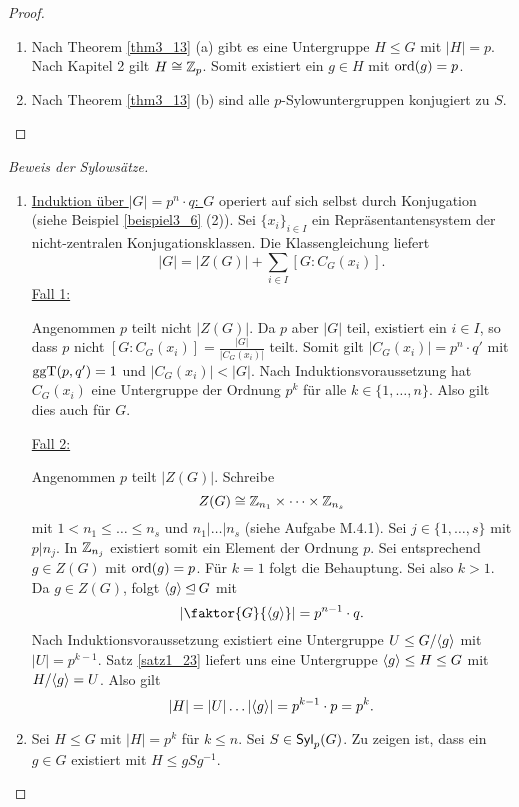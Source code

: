 \begin{proof}
	\begin{enumerate}[label=(\alph*)]
		\item Nach Theorem \ref{thm3_13} (a) gibt es eine Untergruppe $H \leq G$ mit $|H| = p$. Nach Kapitel 2 gilt $H \cong \mathbb{Z}_p$. Somit existiert ein $g \in H$ mit $\mathrm{ord}(g) = p$.
		\item Nach Theorem \ref{thm3_13} (b) sind alle $p$-Sylowuntergruppen konjugiert zu $S$.
	\end{enumerate}
\end{proof}
\begin{proof}[Beweis der Sylowsätze]
	\begin{enumerate}[label=(\alph*)]
		\item \underline{Induktion über $|G| = p^n \cdot q$: } $G$ operiert auf sich selbst durch Konjugation (siehe Beispiel \ref{beispiel3_6} (2)). Sei $\{x_i\}_{i \in I}$ ein Repräsentantensystem der nicht-zentralen Konjugationsklassen. Die Klassengleichung liefert
		\[|G| = |Z(G)| + \sum_{i \in I} [G : C_G(x_i)].\]
		\underline{Fall 1:}
		
		Angenommen $p$ teilt nicht $|Z(G)|$. Da $p$ aber $|G|$ teil, existiert ein $i \in I$, so dass $p$ nicht $[G : C_G(x_i)]=\frac{|G|}{|C_G(x_i)|}$ teilt. Somit gilt $|C_G(x_i)| = p^n \cdot q'$ mit $\mathrm{ggT}(p, q') = 1$ und $|C_G(x_i)| < |G|$. Nach Induktionsvoraussetzung hat $C_G(x_i)$ eine Untergruppe der Ordnung $p^k$ für alle $k \in \{1, \dots, n\}$. Also gilt dies auch für $G$.
		
		\underline{Fall 2: }
		
		Angenommen $p$ teilt $|Z(G)|$. Schreibe 
		\[Z(G) \cong \mathbb{Z}_{n_1} \times \dots \times \mathbb{Z}_{n_s}\]
		mit $1 < n_1 \leq \dots \leq n_s$ und $n_1 \vert \dots \vert n_s$ (siehe Aufgabe M.4.1). Sei $j \in \{1, \dots, s\}$ mit $p \vert n_j$. In $\mathbb{Z}_{n_j}$ existiert somit ein Element der Ordnung $p$. Sei entsprechend $g \in Z(G)$ mit $\mathrm{ord}(g) = p$. Für $k=1$ folgt die Behauptung. Sei also $k > 1$. Da $g \in Z(G)$, folgt $\langle g \rangle \unlhd G$ mit
		\[\left|\faktor{G}{\spn{g}}\right| = p^{n-1} \cdot q.\]
		Nach Induktionsvoraussetzung existiert eine Untergruppe $U \leq G/\langle g \rangle$ mit $|U| = p^{k-1}$. Satz \ref{satz1_23} liefert uns eine Untergruppe $\langle g \rangle \leq H \leq G$ mit $H/\langle g \rangle = U$. Also gilt
		\[|H| = |U| \dots |\langle g \rangle| = p^{k-1} \cdot p = p^k.\]
		\item Sei $H \leq G$ mit $|H| = p^k$ für $k \leq n$. Sei $S \in \mathsf{Syl}_p(G)$. Zu zeigen ist, dass ein $g \in G$ existiert mit $H \leq gSg^{-1}$.
		

\end{enumerate}
\end{proof}
